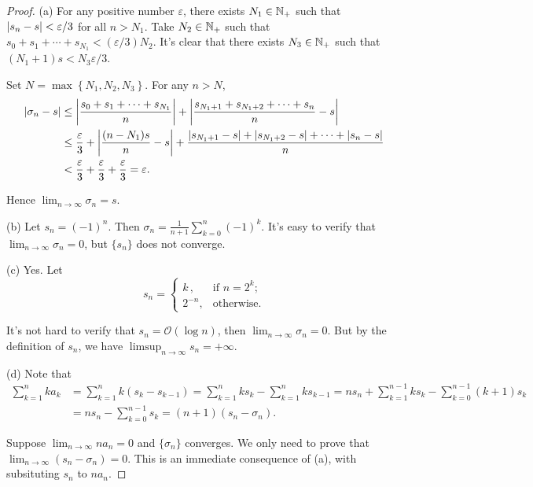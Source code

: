 \documentclass{article}
\begin{document}
\begin{proof}
  (a) For any positive number \( \varepsilon \), there exists \( N_1\in\mathbb{N}_+ \) such that \( \left|s_n-s\right|<\varepsilon/3 \) for all \( n>N_1 \). Take \( N_2\in\mathbb{N}_+ \) such that \( s_0+s_1+\cdots+s_{N_1}<(\varepsilon/3)N_2 \). It's clear that there exists \( N_3\in\mathbb{N}_+ \) such that \( (N_1+1)s<N_3\varepsilon/3 \). \par
  Set \( N=\max \left\{N_1,N_2,N_3\right\} \). For any \( n>N \), 
  \begin{align*}
    \left|\sigma_n-s\right|
    &\le\left|\frac{s_0+s_1+\cdots+s_{N_1}}{n}\right|+\left|\frac{s_{N_1+1}+s_{N_1+2}+\cdots+s_n}{n} - s\right| \\
    &\le\frac{\varepsilon}{3}+\left|\frac{(n-N_1)s}{n}-s\right|+\frac{\left|s_{N_1+1}-s\right|+\left|s_{N_1+2}-s\right|+\cdots+\left|s_n-s\right|}{n} \\
    &<\frac{\varepsilon}{3}+\frac{\varepsilon}{3}+\frac{\varepsilon}{3}
    =\varepsilon.
  \end{align*}\par
  Hence \( \lim_{n\to\infty}\sigma_n=s \). \par
  (b) Let \( s_n=(-1)^n \). Then \( \sigma_n=\frac{1}{n+1}\sum_{k=0}^{n}(-1)^k \). It's easy to verify that \( \lim_{n\to\infty}\sigma_n=0 \), but \( \{s_n\} \) does not converge. \par
  (c) Yes. Let
  \[ s_n=\begin{cases}
    k\,, & \text{if } n=2^k;\\
    2^{-n}, & \text{otherwise.}
  \end{cases} \]\par
  It's not hard to verify that \( s_n=\mathcal{O}(\log n) \), then \( \lim_{n\to\infty}\sigma_n=0 \). But by the definition of \( s_n \), we have \( \limsup_{n\to\infty}s_n=+\infty \).\par
  (d) Note that
  \begin{align*}
    \sum_{k=1}^{n} k a_k 
    & = \sum_{k=1}^{n} k (s_k - s_{k-1}) 
    = \sum_{k=1}^{n} k s_k - \sum_{k=1}^{n} k s_{k-1} 
    = n s_n + \sum_{k=1}^{n-1} k s_k - \sum_{k=0}^{n-1} (k+1) s_k \\
    & = n s_n - \sum_{k=0}^{n-1} s_k = (n+1)(s_n-\sigma_n).
  \end{align*}\par
  Suppose \( \lim_{n\to\infty}na_n=0 \) and \( \{\sigma_n\} \) converges. We only need to prove that \( \lim_{n\to\infty}(s_n-\sigma_n)=0 \). This is an immediate consequence of (a), with subsituting \( s_n \) to \( na_n \).\par

\end{proof}
\end{document}
